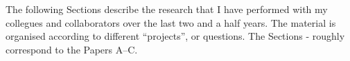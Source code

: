 \documentclass[thesis.tex]{subfiles}
\begin{document}
The following Sections describe the research that I have performed with my collegues and collaborators over the last two and a half years. The material is organised according to different ``projects'', or questions. The Sections - roughly correspond to the Papers A--C.
\end{document}
